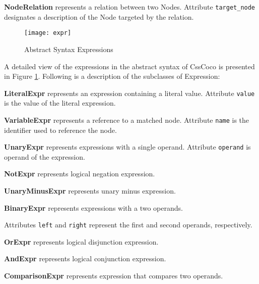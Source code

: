\documentclass[parskip=full]{uvamscse}
\begin{document}
\begin{description}
\item\textbf{NodeRelation} represents a relation between two Nodes. Attribute \texttt{target\_node}
designates a description of the Node targeted by the relation.

\end{description}


\begin{figure}[h!]
  \centering
  \caption{Abstract Syntax Expressions}
  \label{fig:expressions}
  \texttt{[image: expr]}
\end{figure}

A detailed view of the expressions in the abstract syntax of CssCoco is presented in Figure \ref{fig:expressions}. Following is a description of the subclasses of Expression:

\begin{description}

\item\textbf{LiteralExpr} represents an expression containing a literal value. Attribute \texttt{value} is the value of the literal expression.

\item\textbf{VariableExpr} represents a reference to a matched node. Attribute \texttt{name} is the identifier used to reference the node.

\item\textbf{UnaryExpr} represents expressions with a single operand. Attribute \texttt{operand} is operand of the expression.

\item\textbf{NotExpr} represents logical negation expression.

\item\textbf{UnaryMinusExpr} represents unary minus expression.

\item\textbf{BinaryExpr} represents expressions with a two operands.

Attributes \texttt{left} and \texttt{right} represent the first and second operands, respectively.

\item\textbf{OrExpr} represents logical disjunction expression.

\item\textbf{AndExpr} represents logical conjunction expression.

\item\textbf{ComparisonExpr} represents expression that compares two operands.


\end{description}
\end{document}
